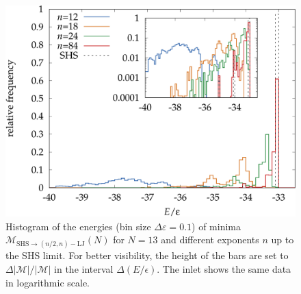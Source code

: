 \begin{figure}
    \centering
    \includegraphics[width=0.8\columnwidth]{kslj/N13-steps.pdf}
    \caption{Histogram of the energies (bin size $\Delta\varepsilon=0.1$) of
    minima $\mathcal{M}_{\text{SHS}\to (n/2,n)-\text{LJ}}(N)$ for $N=13$ and
    different exponents $n$ up to the SHS limit. For better visibility, the
    height of the bars are set to $\Delta|\mathcal{M}|/|\mathcal{M}|$ in the
    interval $\Delta(E/\epsilon)$. The inlet shows the same data in logarithmic
    scale.}
    \label{fig:N13-steps}
\end{figure}



